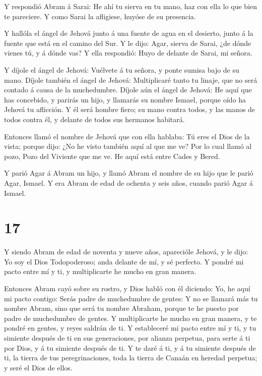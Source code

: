  Y respondió Abram á Sarai: He ahí tu sierva en tu mano, haz
con ella lo que bien te pareciere. Y como Sarai la afligiese, huyóse de
su presencia.

 Y hallóla el ángel de Jehová junto á una fuente de agua en
el desierto, junto á la fuente que está en el camino del Sur.
 Y le dijo: Agar, sierva de Sarai, ¿de dónde vienes tú, y á
dónde vas? Y ella respondió: Huyo de delante de Sarai, mi señora.

 Y díjole el ángel de Jehová: Vuélvete á tu señora, y ponte
sumisa bajo de su mano.  Díjole también el ángel de Jehová:
Multiplicaré tanto tu linaje, que no será contado á causa de la
muchedumbre.  Díjole aún el ángel de Jehová: He aquí que
has concebido, y parirás un hijo, y llamarás su nombre Ismael, porque
oído ha Jehová tu aflicción.  Y él será hombre fiero; su
mano contra todos, y las manos de todos contra él, y delante de todos
sus hermanos habitará.

 Entonces llamó el nombre de Jehová que con ella hablaba:
Tú eres el Dios de la vista; porque dijo: ¿No he visto también aquí al
que me ve?  Por lo cual llamó al pozo, Pozo del Viviente
que me ve. He aquí está entre Cades y Bered.

 Y parió Agar á Abram un hijo, y llamó Abram el nombre de
su hijo que le parió Agar, Ismael.  Y era Abram de edad de
ochenta y seis años, cuando parió Agar á Ismael.

\hypertarget{section-16}{%
\section{17}\label{section-16}}

 Y siendo Abram de edad de noventa y nueve años, aparecióle
Jehová, y le dijo: Yo soy el Dios Todopoderoso; anda delante de mí, y sé
perfecto.  Y pondré mi pacto entre mí y ti, y multiplicarte
he mucho en gran manera.

 Entonces Abram cayó sobre su rostro, y Dios habló con él
diciendo:  Yo, he aquí mi pacto contigo: Serás padre de
muchedumbre de gentes:  Y no se llamará más tu nombre Abram,
sino que será tu nombre Abraham, porque te he puesto por padre de
muchedumbre de gentes.  Y multiplicarte he mucho en gran
manera, y te pondré en gentes, y reyes saldrán de ti.  Y
estableceré mi pacto entre mí y ti, y tu simiente después de ti en sus
generaciones, por alianza perpetua, para serte á ti por Dios, y á tu
simiente después de ti.  Y te daré á ti, y á tu simiente
después de ti, la tierra de tus peregrinaciones, toda la tierra de
Canaán en heredad perpetua; y seré el Dios de ellos.

